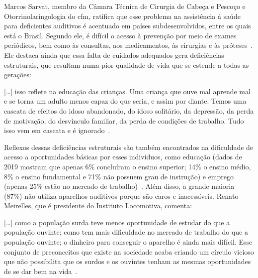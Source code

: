 Marcos Sarvat, membro da Câmara Técnica de Cirurgia de Cabeça e Pescoço e Otorrinolaringologia do \acrfull{cfm}, ratifica que esse problema na assistência à saúde para deficientes auditivos é acentuado em países subdesenvolvidos, entre os quais está o Brasil. Segundo ele, é difícil o acesso à prevenção por meio de exames periódicos, bem como às consultas, aos medicamentos, às cirurgias e às próteses~\cite{ebc-2021-oms-estima}. Ele destaca ainda que essa falta de cuidados adequados gera deficiências estruturais, que resultam numa pior qualidade de vida que se estende a todas as gerações:


\begin{citacao}
    {[\dots]} isso reflete na educação das crianças. Uma criança que ouve mal aprende mal e se torna um adulto menos capaz do que seria, e assim por diante. Temos uma cascata de efeitos do idoso abandonado, do idoso solitário, da depressão, da perda de motivação, do desvínculo familiar, da perda de condições de trabalho. Tudo isso vem em cascata e é ignorado~\cite{ebc-2021-oms-estima}.
\end{citacao}

Reflexos dessas deficiências estruturais são também encontrados na dificuldade de acesso a oportunidades básicas por esses indivíduos, como educação (dados de 2019 mostram que apenas 6\% concluíram o ensino superior; 14\% o ensino médio, 8\% o ensino fundamental e 71\% não possuem grau de instrução) e emprego (apenas 25\% estão no mercado de trabalho)~\cite{ibge-2021-pns}. Além disso, a grande maioria (87\%) não utiliza aparelhos auditivos porque são caros e inacessíveis. Renato Meirelles, que é presidente do Instituto Locomotiva, comenta:

\begin{citacao}
    {[\dots]} como a população surda teve menos oportunidade de estudar do que a população ouvinte; como tem mais dificuldade no mercado de trabalho do que a população ouvinte; o dinheiro para conseguir o aparelho é ainda mais difícil. Esse conjunto de preconceitos que existe na sociedade acaba criando um círculo vicioso que não possibilita que os surdos e os ouvintes tenham as mesmas oportunidades de se dar bem na vida~\cite{ebc-2019-10-milhoes-pessoas}.
\end{citacao}


